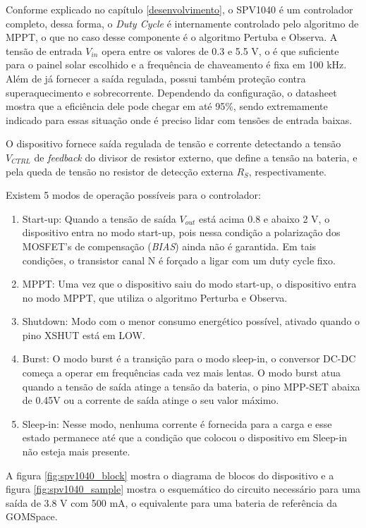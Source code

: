 Conforme explicado no capítulo \ref{desenvolvimento}, o SPV1040 é um controlador completo, dessa forma, o \textit{Duty Cycle} é internamente controlado pelo algoritmo de MPPT, o que no caso desse componente é o algoritmo Pertuba e Observa. A tensão de entrada $V_{in}$ opera entre os valores de 0.3 e 5.5 V, o é que suficiente para o painel solar escolhido e a frequência de chaveamento é fixa em 100 kHz. Além de já fornecer a saída regulada, possui também proteção contra superaquecimento e sobrecorrente. Dependendo da configuração, o datasheet mostra que a eficiência dele pode chegar em até 95\%, sendo extremamente indicado para essas situação onde é preciso lidar com tensões de entrada baixas. 

O dispositivo fornece saída regulada de tensão e corrente detectando a tensão $V_{CTRL}$ de \textit{feedback} do divisor de resistor externo, que define a tensão na bateria, e pela queda de tensão no resistor de detecção externa $R_{S}$, respectivamente.

Existem 5 modos de operação possíveis para o controlador:
\begin{enumerate}
    \item Start-up: Quando a tensão de saída $V_{out}$ está acima 0.8 e abaixo 2 V, o dispositivo entra no modo start-up, pois nessa condição a polarização dos MOSFET's de compensação (\textit{BIAS}) ainda não é garantida. Em tais condições, o transistor canal N é forçado a ligar com um duty cycle fixo.
    \item MPPT: Uma vez que o dispositivo saiu do modo start-up, o dispositivo entra no modo MPPT, que utiliza o algoritmo Perturba e Observa.
    \item Shutdown: Modo com o menor consumo energético possível, ativado quando o pino XSHUT está em LOW.
    \item Burst: O modo burst é a transição para o modo sleep-in, o conversor DC-DC começa a operar em frequências cada vez mais lentas. O modo burst atua quando a tensão de saída atinge a tensão da bateria, o pino MPP-SET abaixa de 0.45V ou a corrente de saída atinge o seu valor máximo.
    \item Sleep-in: Nesse modo, nenhuma corrente é fornecida para a carga e esse estado permanece até que a condição que colocou o dispositivo em Sleep-in não esteja mais presente.
\end{enumerate}

A figura \ref{fig:spv1040_block} mostra o diagrama de blocos do dispositivo e a figura \ref{fig:spv1040_sample} mostra o esquemático do circuito necessário para uma saída de 3.8 V com 500 mA, o equivalente para uma bateria de referência da GOMSpace.

